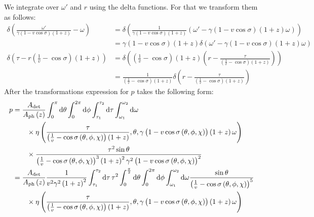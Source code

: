 \documentclass[manuscript]{aastex}
\begin{document}
We integrate over $\omega'$ and $r$ using the delta functions. For
that we transform them as follows:
\begin{align*}
\delta\left( \frac{\omega'}{\gamma \left( 1 - v\cos\sigma \right)\left(1+z\right)} - \omega \right) &= \delta\left( \frac{1}{\gamma\left( 1-v\cos\sigma \right)\left(1+z\right)} \left( \omega' - \gamma\left( 1 - v\cos\sigma \right) \left(1+z\right) \omega \right) \right) \\
&= \gamma\left( 1 - v\cos\sigma \right) \left(1+z\right) \delta\left( \omega' - \gamma\left( 1 - v\cos\sigma \right) \left(1+z\right) \omega \right)\\
\delta\left(\tau - r\left( \frac{1}{v} - \cos\sigma \right)\left(1+z\right)\right) &= \delta\left( \left( \frac{1}{v} - \cos\sigma \right) \left( 1+z \right) \left( r - \frac{\tau}{\left(\frac{1}{v} - \cos\sigma\right)\left(1+z\right)} \right) \right) \\
&= \frac{1}{\left(\frac{1}{v} - \cos\sigma\right)\left(1+z\right)} \delta\left( r - \frac{\tau}{\left(\frac{1}{v} - \cos\sigma\right)\left(1+z\right)} \right)
\end{align*}
After the transformations expression for $p$ takes the following form:
\begin{align}
p &= \frac{A_\text{det}}{A_\text{ph}\left(z\right)} \int_0^{\pi} \dif \theta \int_0^{2\pi} \dif \phi \int_{\tau_1}^{\tau_2} \dif \tau \int_{\omega_1}^{\omega_2} \dif \omega \nonumber\\
&\qquad {} \times \eta\left( \frac{\tau}{\left(\frac{1}{v} - \cos\sigma\left(\theta, \phi, \chi\right)\right)\left(1+z\right)}, \theta, \gamma\left( 1 - v\cos\sigma\left(\theta, \phi, \chi\right) \right)\left(1+z\right)\omega  \right) \nonumber\\
&\qquad {} \times \frac{\tau^2 \sin\theta}{\left(\frac{1}{v} - \cos\sigma\left(\theta, \phi, \chi\right)\right)^3 \left(1+z\right)^2 \gamma^2 \left(1-v\cos\sigma\left(\theta, \phi, \chi\right)\right)^2} \nonumber\\
&= \frac{A_\text{det}}{A_\text{ph}\left(z\right)} \frac{1}{v^2 \gamma^2 \left(1+z\right)^2} \int_{\tau_1}^{\tau_2} \dif \tau \, \tau^2 \int_0^{\frac{\pi}{2}} \dif \theta \int_0^{2\pi} \dif \phi \int_{\omega_1}^{\omega_2} \dif \omega \frac{\sin\theta}{\left(\frac{1}{v} - \cos\sigma\left(\theta, \phi, \chi\right)\right)^5} \nonumber\\
&\qquad {} \times \eta\left( \frac{\tau}{\left(\frac{1}{v} - \cos\sigma\left(\theta, \phi, \chi\right)\right)\left(1+z\right)}, \theta, \gamma\left( 1 - v\cos\sigma\left(\theta, \phi, \chi\right) \right)\left(1+z\right)\omega  \right)
\end{align}
\end{document}
